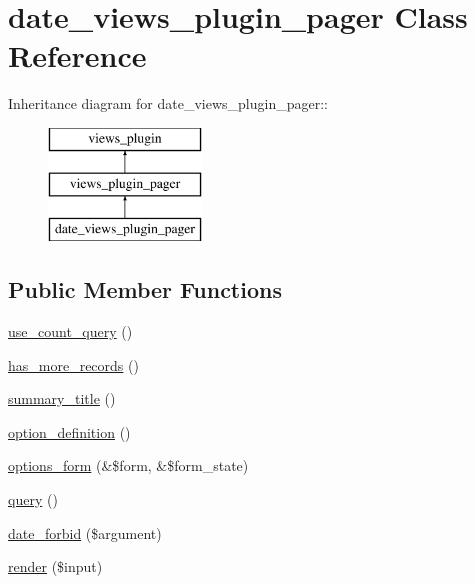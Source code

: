 \hypertarget{classdate__views__plugin__pager}{
\section{date\_\-views\_\-plugin\_\-pager Class Reference}
\label{classdate__views__plugin__pager}
}
Inheritance diagram for date\_\-views\_\-plugin\_\-pager::\begin{figure}[H]
\begin{center}
\leavevmode
\includegraphics[height=3cm]{classdate__views__plugin__pager}
\end{center}
\end{figure}
\subsection*{Public Member Functions}
\begin{DoxyCompactItemize}
\item 
\hyperlink{classdate__views__plugin__pager_ad8887dff6ec775d8333c040306e6524d}{use\_\-count\_\-query} ()
\item 
\hyperlink{classdate__views__plugin__pager_ab26f5d4b54954461e72b60789d6efbb1}{has\_\-more\_\-records} ()
\item 
\hyperlink{classdate__views__plugin__pager_a8439f3b4b7c5bf990aff04627d3b38fa}{summary\_\-title} ()
\item 
\hyperlink{classdate__views__plugin__pager_a6b19aa893b485de7ef5b18e1f6fb578a}{option\_\-definition} ()
\item 
\hyperlink{classdate__views__plugin__pager_a8c8bdd845f1b47a3a2e6bcb9729756f8}{options\_\-form} (\&\$form, \&\$form\_\-state)
\item 
\hyperlink{classdate__views__plugin__pager_a59ac4b003dc6526dea57ec530266274b}{query} ()
\item 
\hyperlink{classdate__views__plugin__pager_ae6523462e3a9ecd80749bf28a2cfcbeb}{date\_\-forbid} (\$argument)
\item 
\hyperlink{classdate__views__plugin__pager_a607a0d8a316a4b74f85205f35a59ce5a}{render} (\$input)
\end{DoxyCompactItemize}


